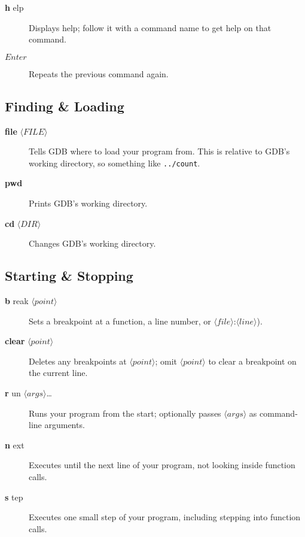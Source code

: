 \documentclass[11pt]{article}
\newcommand\dbc[2]{{%
  \sffamily\upshape\mdseries
  \textbf{\textcolor{Abbreviation} {#1}}%
  #2}}
\newcommand\abw[1]{$\langle\mathit{#1}\rangle$}
\begin{document}
\begin{multicols}{2}
\begin{description}
  \item[\dbc{h}{elp}] Displays help; follow it with a command name to
    get help on that command.

  \item[$\mathit{Enter}$] Repeats the previous command
    again.

\end{description}

\subsection*{Finding \& Loading}

\begin{description}
  \item[\dbc{file}{} \abw{FILE}] Tells GDB where to load your program
    from. This is relative to GDB’s working directory, so
    something like \verb!../count!.

  \item[\dbc{pwd}{}] Prints GDB’s working directory.

  \item[\dbc{cd}{} \abw{DIR}] Changes GDB’s working directory.
\end{description}

\subsection*{Starting \& Stopping}
\begin{description}

  \item[\dbc{b}{reak} \abw{point}] Sets a breakpoint at a function, a
    line number, or \abw{file}:\abw{line}).

  \item[\dbc{clear}{} \abw{point}] Deletes any breakpoints at
    \abw{point}; omit \abw{point} to clear a breakpoint on the current
    line.

  \item[\dbc{r}{un} \abw{args}\ldots] Runs your program from the start;
    optionally passes \abw{args} as command-line arguments.

  \item[\dbc{n}{ext}] Executes until the next line of your program, not
    looking inside function calls.

  \item[\dbc{s}{tep}] Executes one small step of your program, including
    stepping into function calls.


\end{description}
\end{multicols}
\end{document}
